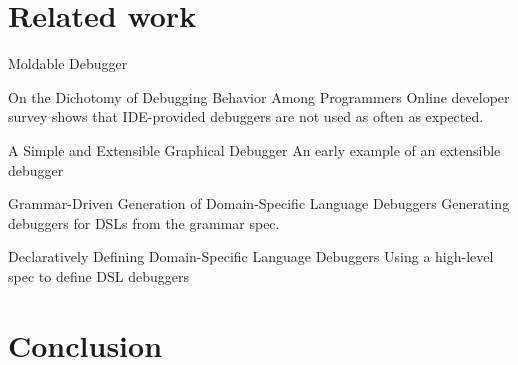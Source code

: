 \documentclass[sigplan,anonymous,review,10pt]{acmart}
\begin{document}
\section{Related work}\label{sec:related}


Moldable Debugger
\cite{Chis15c}

On the Dichotomy of Debugging Behavior Among Programmers
\cite{Bell18a}
Online developer survey shows that IDE-provided debuggers are not used as often as expected.

A Simple and Extensible Graphical Debugger
\cite{Hans97a}
An early example of an extensible debugger

Grammar-Driven Generation of Domain-Specific Language Debuggers
\cite{HuiW08a}
Generating debuggers for DSLs from the grammar spec.

Declaratively Defining Domain-Specific Language Debuggers
\cite{Lind11a}
Using a high-level spec to define DSL debuggers


\section{Conclusion}\label{sec:conclusion}






\end{document}
